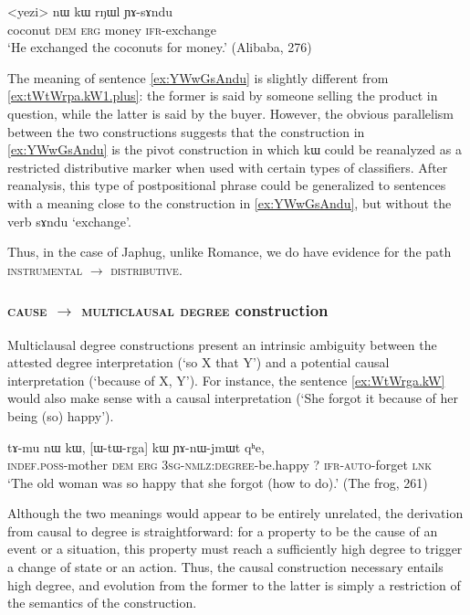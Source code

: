\documentclass[oldfontcommands,oneside,a4paper,11pt]{article}
\newcommand{\ipa}[1]{{\phon #1}} %
\begin{document}
  \begin{exe}
\ex \label{ex:YAsAndu}
\gll 
<yezi> 	\ipa{nɯ}  	\ipa{kɯ}  	\ipa{rŋɯl}  	\ipa{ɲɤ-sɤndu}  \\
coconut \textsc{dem} \textsc{erg} money \textsc{ifr}-exchange  \\
\glt `He exchanged the coconuts for money.' (Alibaba, 276)
\end{exe}

The meaning of sentence \ref{ex:YWwGsAndu} is slightly different from \ref{ex:tWtWrpa.kW1.plus}: the former is  said by someone selling the product in question, while the latter is said by the buyer. However, the obvious parallelism between the two constructions suggests that the construction in \ref{ex:YWwGsAndu} is the pivot construction in which  \ipa{kɯ} could be reanalyzed as a restricted distributive marker when used with certain types of classifiers. After reanalysis, this type of postpositional phrase could be generalized to sentences with a meaning close to the construction in \ref{ex:YWwGsAndu}, but without the verb  \ipa{sɤndu} `exchange'.


Thus, in the case of Japhug, unlike Romance, we do have evidence for the path \textsc{instrumental} $\rightarrow$ \textsc{distributive}.
  

\subsubsection{\textsc{cause} $\rightarrow$ \textsc{multiclausal degree} construction} \label{sec:cause2degree}

Multiclausal degree constructions  present an intrinsic ambiguity between the attested degree interpretation (`so X that Y') and a potential causal interpretation (`because of X, Y').  For instance, the sentence \ref{ex:WtWrga.kW} would also make sense  with a causal interpretation (`She forgot it because of her being (so) happy').

 \begin{exe} 
 \ex \label{ex:WtWrga.kW}
\gll 
\ipa{tɤ-mu}  	\ipa{nɯ}  	\ipa{kɯ,}  	  	[\ipa{ɯ-tɯ-rga}]  	\ipa{kɯ}  	\ipa{ɲɤ-nɯ-jmɯt}  	\ipa{qʰe,}  \\
\textsc{indef.poss}-mother \textsc{dem} \textsc{erg} \textsc{3sg-nmlz:degree}-be.happy ?{ } \textsc{ifr-auto}-forget  \textsc{lnk} \\
\glt `The old woman was so happy that she forgot (how to do).' (The frog, 261)
 \end{exe} 
 
 
Although the two meanings would appear to be entirely unrelated, the derivation from causal to degree is straightforward: for a property to be the cause of an event or a situation, this property must reach a sufficiently high degree to trigger a change of state or an action. Thus,  the causal construction necessary entails high degree, and evolution from the former to the latter is simply a restriction of the semantics of the construction.
\end{document}
